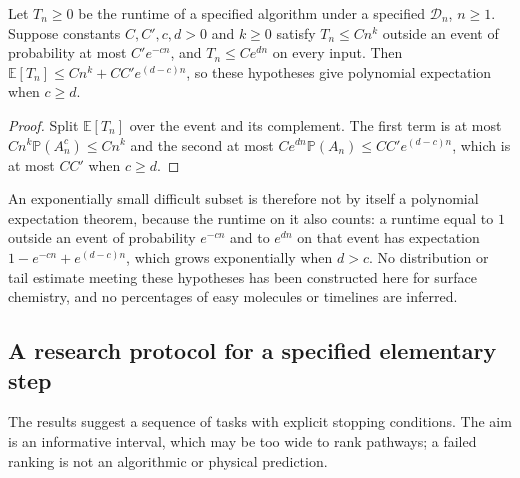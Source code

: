 \begin{proposition}
\label{prop:average}
Let $T_n\ge0$ be the runtime of a specified algorithm under a specified
$\mathcal D_n$, $n\ge1$. Suppose constants $C,C',c,d>0$ and $k\ge0$ satisfy
$T_n\le Cn^k$ outside an event of probability at most $C'e^{-cn}$, and
$T_n\le Ce^{dn}$ on every input. Then
$\mathbb E[T_n]\le Cn^k+CC'e^{(d-c)n}$, so these hypotheses give polynomial
expectation when $c\ge d$.
\end{proposition}
\begin{proof}
Split $\mathbb E[T_n]$ over the event and its complement. The first term is at
most $Cn^k\mathbb P(A_n^{c})\le Cn^k$ and the second at most
$Ce^{dn}\mathbb P(A_n)\le CC'e^{(d-c)n}$, which is at most $CC'$ when $c\ge d$.
\end{proof}

An exponentially small difficult subset is therefore not by itself a polynomial
expectation theorem, because the runtime on it also counts: a runtime equal to
$1$ outside an event of probability $e^{-cn}$ and to $e^{dn}$ on that event has
expectation $1-e^{-cn}+e^{(d-c)n}$, which grows exponentially when $d>c$. No
distribution or tail estimate meeting these hypotheses has been constructed here
for surface chemistry, and no percentages of easy molecules or timelines are
inferred.

\subsection{A research protocol for a specified elementary step}
The results suggest a sequence of tasks with explicit stopping conditions. The
aim is an informative interval, which may be too wide to rank pathways; a failed
ranking is not an algorithmic or physical prediction.

